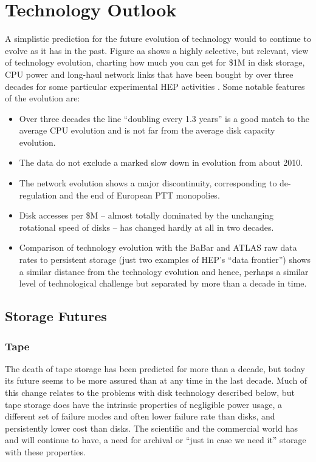 \section{Technology Outlook}
\label{sec:cpfi5-technology}
A simplistic prediction for the future evolution of technology would to continue to evolve as it has in the past.  Figure aa shows a highly selective, but relevant, view of technology evolution, charting how much you can get for \$1M in disk storage, CPU power and long-haul network links that have been bought by over three decades for some particular experimental HEP activities .  Some notable features of the evolution are:
\begin{itemize}
\item
Over three decades the line “doubling every 1.3 years” is a good match to the average CPU evolution and is not far from the average disk capacity evolution.
\item
The data do not exclude a marked slow down in evolution from about 2010.
\item
The network evolution shows a major discontinuity, corresponding to de-regulation and the end of European PTT monopolies.
\item
Disk accesses per \$M – almost totally dominated by the unchanging rotational speed of disks – has changed hardly at all in two decades.
\item
Comparison of technology evolution with the BaBar and ATLAS raw data rates to persistent storage (just two examples of HEP’s “data frontier”) shows a similar distance from the technology evolution and hence, perhaps a similar level of technological challenge but separated by more than a decade in time. 
\end{itemize}

\subsection{Storage Futures}
\subsubsection{Tape}
The death of tape storage has been predicted for more than a decade, but today its future seems to be more assured than at any time in the last decade.  Much of this change relates to the problems with disk technology described below, but tape storage does have the intrinsic properties of negligible power usage, a different set of failure modes and often lower failure rate than disks, and persistently lower cost than disks.  The scientific and the commercial world has and will continue to have, a need for archival or “just in case we need it” storage with these properties.

